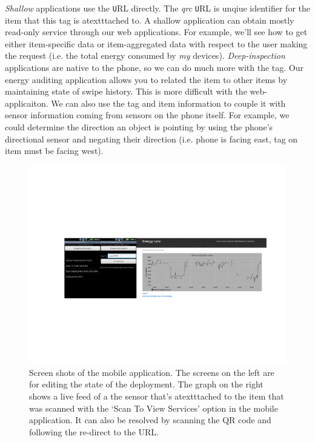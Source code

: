 \emph{Shallow} applications
use the {\texttt URL} directly.  The \emph{qrc} {\texttt URL} is unqiue identifier for the item that this tag is atextttached to.
A shallow application can obtain mostly read-only service through our web applications.  For example, we'll see how
to get either item-specific data or item-aggregated data with respect to the user making the request (i.e. the total
energy consumed by \emph{my} devices).  \emph{Deep-inspection} applications are native to the phone, so we can do much
more with the tag.  Our energy auditing application allows you to related the item to other items by maintaining state of swipe
history.  This is more difficult with the web-applicaiton.  We can also use the tag and item information to couple it with
sensor information coming from sensors on the phone itself.  For example, we could determine the direction an object
is pointing by using the phone's directional sensor and negating their direction (i.e. phone is facing east, tag on item must
be facing west).

\begin{figure}[htb!]
\begin{center}
\includegraphics[width=\textwidth]{figs/mobileapp}
\caption{Screen shots of the mobile application.  The screens on the left are for editing the state of the deployment.
The graph on the right shows a live feed of a the sensor that's atextttached to the item that was scanned with the `Scan To
View Services' option in the mobile application.  It can also be resolved by scanning the QR code and following the re-direct
to the URL.}
\label{fig:mobileapp}
\end{center}
\end{figure}

